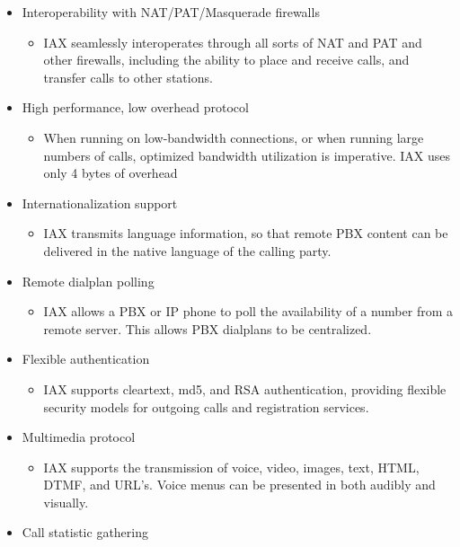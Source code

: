 \begin{itemize}
	\item Interoperability with NAT/PAT/Masquerade firewalls
	\begin{itemize}
	     \item IAX seamlessly interoperates through all sorts of NAT and PAT
             and other firewalls, including the ability to place and 
             receive calls, and transfer calls to other stations.
	\end{itemize}
	\item High performance, low overhead protocol
	\begin{itemize}
	     \item When running on low-bandwidth connections, or when running 
	     large numbers of calls, optimized bandwidth utilization is 
	     imperative.  IAX uses only 4 bytes of overhead
	\end{itemize}
	\item Internationalization support
	\begin{itemize}
	     \item IAX transmits language information, so that remote PBX 
	     content can be delivered in the native language of the
	     calling party.
	\end{itemize}
	\item Remote dialplan polling
	\begin{itemize}
	     \item IAX allows a PBX or IP phone to poll the availability of a 
	     number from a remote server.  This allows PBX dialplans to 
	     be centralized.
	\end{itemize}
	\item Flexible authentication
	\begin{itemize}
	     \item IAX supports cleartext, md5, and RSA authentication, 
	     providing flexible security models for outgoing calls and 
	     registration services.
	\end{itemize}	
	\item Multimedia protocol
	\begin{itemize}
	     \item IAX supports the transmission of voice, video, images, text, 
	     HTML, DTMF, and URL's.  Voice menus can be presented in both
	     audibly and visually.
	\end{itemize}
	\item Call statistic gathering
	\begin{itemize}

\end{itemize}
\end{itemize}

